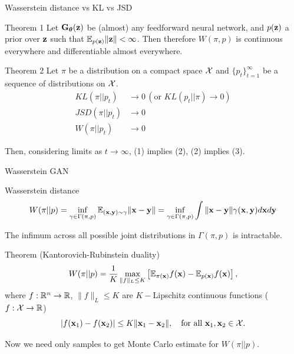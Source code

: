 \begin{frame}{Wasserstein distance vs KL vs JSD}
	\begin{block}{Theorem 1}
		Let $\mathbf{G}_{\boldsymbol{\theta}}(\mathbf{z})$ be (almost) any feedforward neural network, and $p(\mathbf{z})$ a prior over $\mathbf{z}$ such that $\mathbb{E}_{p(\mathbf{z})} \|\mathbf{z}\| < \infty$. Then therefore $W(\pi, p)$ is continuous everywhere and differentiable almost everywhere.
	\end{block}
	\begin{block}{Theorem 2}
		Let $\pi$ be a distribution on a compact space $\mathcal{X}$ and $\{p_t\}_{t=1}^\infty$ be a sequence of distributions on $\mathcal{X}$. 
		\begin{align}
			KL(\pi || p_t) &\rightarrow 0 \, (\text{or }KL (p_t || \pi) \rightarrow 0) \\
			JSD(\pi || p_t) &\rightarrow 0 \\
			W(\pi || p_t) &\rightarrow 0
		\end{align}
		
		Then, considering limits as $t \rightarrow \infty$, (1) implies (2), (2) implies (3).
	\end{block}
\end{frame}
\begin{frame}{Wasserstein GAN}
	\begin{block}{Wasserstein distance}
		\vspace{-0.5cm}
		\[
		W(\pi || p) = \inf_{\gamma \in \Gamma(\pi, p)} \mathbb{E}_{(\mathbf{x}, \mathbf{y}) \sim \gamma} \| \mathbf{x} - \mathbf{y} \| =  \inf_{\gamma \in \Gamma(\pi, p)} \int \| \mathbf{x} - \mathbf{y} \| \gamma (\mathbf{x}, \mathbf{y}) d \mathbf{x} d \mathbf{y}
		\]
		\vspace{-0.3cm}
	\end{block}
	The infimum across all possible joint distributions in $\Gamma(\pi, p)$ is intractable.
	\begin{block}{Theorem (Kantorovich-Rubinstein duality)}
		\vspace{-0.3cm}
		\[
		W(\pi || p) = \frac{1}{K} \max_{\| f \|_L \leq K} \left[ \mathbb{E}_{\pi(\mathbf{x})} f(\mathbf{x})  - \mathbb{E}_{p(\mathbf{x})} f(\mathbf{x})\right],
		\]
		where $f : \mathbb{R}^n \rightarrow \mathbb{R}$, $\| f \|_L \leq K$ are $K-$Lipschitz continuous functions ($f: \mathcal{X} \rightarrow \mathbb{R}$)
		\vspace{-0.2cm}
		\[
		|f(\mathbf{x}_1) - f(\mathbf{x}_2)| \leq K \| \mathbf{x}_1 - \mathbf{x}_2 \|, \quad \text{for all } \mathbf{x}_1, \mathbf{x}_2 \in \mathcal{X}.
		\]
		\vspace{-0.6cm}
	\end{block}
	Now we need only samples to get Monte Carlo estimate for $W(\pi || p)$.
	
\end{frame}

